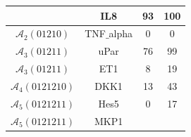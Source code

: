\begin{table}[!t]
\begin{tabular}{|c|c||c|c|}
&

IL8

&

93

&

100

\\ \hline

$\mathcal{A}_{2}(01210)$

&

TNF$\_$alpha

&

0

&

0

\\ \hline

$\mathcal{A}_{3}(01211)$

&

uPar

&

76

&

99

\\ \hline

$\mathcal{A}_{3}(01211)$

&

ET1

&

8

&

19

\\ \hline

$\mathcal{A}_{4}(0121210)$

&

DKK1

&

13

&

43

\\ \hline

$\mathcal{A}_{5}(0121211)$

&

Hes5


&

0

&

17

\\ \hline

$\mathcal{A}_{5}(0121211)$

&

MKP1



\end{tabular}
\end{table}
